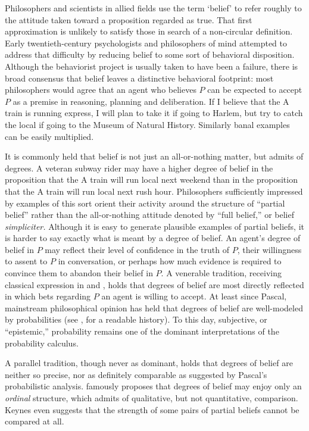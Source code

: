 Philosophers and scientists in allied fields use the term `belief' to refer
roughly to the attitude taken toward a proposition regarded as true. That first
approximation is unlikely to satisfy those in search of a non-circular
definition. Early twentieth-century psychologists and  philosophers of mind
attempted to address that difficulty by reducing belief to some sort of
behavioral disposition. Although the behaviorist project is usually taken to
have been a failure, there is broad consensus that belief leaves a distinctive
behavioral footprint: most philosophers would agree that an agent who believes
$P$ can be expected to accept $P$ as a premise in reasoning, planning and
deliberation. If I believe that the A train is running express, I will plan to
take it if going to Harlem, but try to catch the local if going to the Museum of
Natural History. Similarly banal examples can be easily multiplied. 

It is commonly held that belief is not just an all-or-nothing matter, but admits
of degrees. A veteran subway rider may have a higher degree of belief in the
proposition that the A train will run local next weekend than in the proposition
that the A train will run local  next rush hour. Philosophers sufficiently
impressed by examples of this sort orient their activity around the structure of
``partial belief'' rather than the all-or-nothing attitude denoted by ``full
belief,'' or belief {\em simpliciter.} Although it is easy to generate plausible
examples of partial beliefs, it is harder to say exactly what is meant by a
degree of belief. An agent's degree of belief in $P$ may reflect their level of
confidence in the truth of $P$, their willingness to assent to $P$ in
conversation, or perhaps how much evidence is required to convince them to
abandon their belief in $P$. A venerable tradition, receiving classical
expression in \citet{ramseytruth} and \citet{de1937prevision}, holds that
degrees of belief are most directly reflected in which bets regarding $P$  an
agent is willing to accept. At least since Pascal, mainstream philosophical
opinion has held that degrees of belief are well-modeled by probabilities (see
\citealp{hacking1975}, for a readable history). To this day, subjective, or
``epistemic,'' probability remains one of the dominant interpretations of the
probability calculus. 

A parallel tradition, though never as dominant, holds that degrees of belief are
neither so precise, nor as definitely comparable as suggested by Pascal's
probabilistic analysis. \citet{keynes1921treatise} famously proposes that
degrees of belief may enjoy only an {\em ordinal} structure, which admits of
qualitative, but not quantitative, comparison. Keynes even suggests that the
strength of some pairs of partial beliefs cannot be compared at all.

